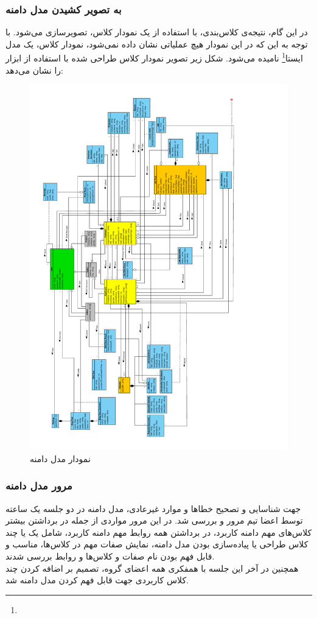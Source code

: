 \documentclass[12pt]{article}
\begin{document}
	\subsubsection{به تصویر کشیدن مدل دامنه}
	در این گام، نتیجه‌ی کلاس‌بندی، با استفاده از یک نمودار کلاس، تصویرسازی می‌شود. با توجه به این که در این نمودار هیچ عملیاتی نشان داده نمی‌شود، نمودار کلاس، یک مدل ایستا\footnote{} نامیده می‌شود. شکل زیر تصویر نمودار کلاس طراحی شده با استفاده از ابزار
	را نشان می‌دهد:
	\begin{figure}
		\centering
		\includegraphics[width=1.2\textwidth, height=0.9\textheight]{files/Project_OOAD_Phase2_DiagramClass_V5_rotated}
		\caption{نمودار مدل دامنه}
		\label{fig:classdiagram}
	\end{figure}

	\newpage
	\subsubsection{مرور مدل دامنه}
	جهت شناسایی و تصحیح خطاها و موارد غیرعادی، مدل دامنه در دو جلسه یک ساعته توسط اعضا تیم مرور و بررسی شد. در این مرور مواردی از جمله در برداشتن بیشتر کلاس‌های مهم دامنه کاربرد، در برداشتن همه‌ روابط مهم دامنه کاربرد، شامل یک یا چند کلاس طراحی یا پیاده‌سازی بودن مدل دامنه، نمایش صفات مهم در کلاس‌ها، مناسب و قابل فهم بودن نام صفات و کلاس‌ها و روابط بررسی شدند.\\
	همچنین در آخر این جلسه با همفکری همه اعضای گروه، تصمیم بر اضافه کردن چند کلاس کاربردی جهت قابل فهم کردن مدل دامنه شد.
\end{document}
